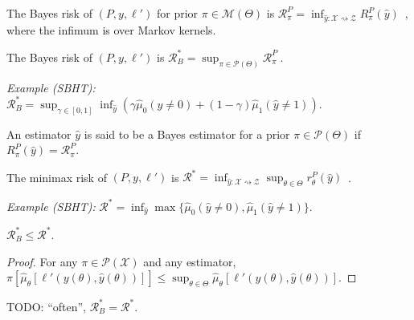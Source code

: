 \begin{definition}
  \label{def:bayesRisk}
  \mathlibok
  The Bayes risk of $(P, y, \ell')$ for prior $\pi \in \mathcal M(\Theta)$ is $\mathcal R^P_\pi = \inf_{\hat{y} : \mathcal X \rightsquigarrow \mathcal Z} R^P_\pi(\hat{y})$~, where the infimum is over Markov kernels.

  The Bayes risk of $(P, y, \ell')$ is $\mathcal R^*_B = \sup_{\pi \in \mathcal P(\Theta)} \mathcal R^P_\pi \: .$
\end{definition}

\emph{Example (SBHT):} $\mathcal R^*_B = \sup_{\gamma \in [0,1]}\inf_{\hat{y}}\left(\gamma \hat{\mu}_0(\hat{y} \ne 0) + (1 - \gamma) \hat{\mu}_1(\hat{y} \ne 1)\right)$.

\begin{definition}
  \label{def:bayesEstimator}
  \mathlibok
  An estimator $\hat{y}$ is said to be a Bayes estimator for a prior $\pi \in \mathcal P(\Theta)$ if $R^P_\pi(\hat{y}) = \mathcal R^P_\pi$.
\end{definition}

\begin{definition}
  \label{def:minimaxRisk}
  \mathlibok
  The minimax risk of $(P, y, \ell')$ is $\mathcal R^* = \inf_{\hat{y} : \mathcal X \rightsquigarrow \mathcal Z} \sup_{\theta \in \Theta} r^P_\theta(\hat{y})$~.
\end{definition}

\emph{Example (SBHT):} $\mathcal R^* = \inf_{\hat{y}} \max\{\hat{\mu}_0(\hat{y} \ne 0), \hat{\mu}_1(\hat{y} \ne 1)\}$.

\begin{lemma}
  \label{lem:bayesRisk_le_minimaxRisk}
  \mathlibok
  $\mathcal R_B^* \le \mathcal R^*$.
\end{lemma}

\begin{proof}\mathlibok
For any $\pi \in \mathcal P(\mathcal X)$ and any estimator, $\pi\left[\hat{\mu}_\theta\left[\ell'(y(\theta), \hat{y}(\theta))\right]\right] \le \sup_{\theta \in \Theta}\hat{\mu}_\theta\left[\ell'(y(\theta), \hat{y}(\theta))\right]$.
\end{proof}

TODO: ``often'', $\mathcal R^*_B = \mathcal R^*$.




